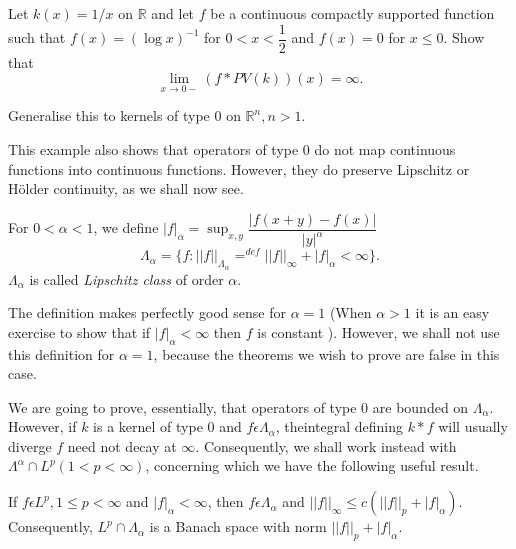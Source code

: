 \begin{exercise} 
  Let $k (x) = 1/x$ on $\mathbb{R}$ and let $f$ be a
  continuous compactly supported function such that $f(x) = (\log
  x)^{-1}$ for $0 < x < \dfrac{1}{2}$ and $f(x) =0$ for $x \leq 0$. Show that  
  $$
  \lim_{x \to 0-} (f * PV (k) ) (x) = \infty.
  $$
\end{exercise}

Generalise this to kernels of type $0$ on $\mathbb{R}^n, n > 1$.

This example also shows that operators of type $0$ do not map
continuous functions into continuous functions. However, they do
preserve Lipschitz or H\"{o}lder continuity, as we shall now see. 

\setcounter{defi}{20}
\begin{defi}\label{chap5:def5.21}%
  For $0< \alpha < 1$, we define $|f|_\alpha = \sup_{x,y} \dfrac{|f
    (x+y) - f (x)|}{|y|^\alpha}$ 
  $$
  \Lambda_{\alpha} = \{ f: || f ||_{\Lambda_{\alpha}} =^{def} || f ||
  _{\infty} + | f | _{\alpha} < \infty \}. 
  $$
  $\Lambda_{\alpha}$ is called {\em Lipschitz class} of order $\alpha$.
\end{defi}

\setcounter{rem}{21}
\begin{rem}\label{chap5:rem5.22} %
  The definition makes perfectly good sense for $\alpha =1$ (When
  $\alpha > 1$ it is an easy exercise to show that if $|f|_{\alpha}<
  \infty$ then $f$ is constant ). However, we shall not use this
  definition for $ \alpha = 1$, because the theorems we wish to prove
  are false in this case. 
\end{rem}

We are going to prove, essentially, that operators of type $0$ are
boun\-ded on $\Lambda_{\alpha}$. However, if $k$ is a kernel of type
$0$ and $f \epsilon \Lambda_{\alpha}$, the\pageoriginale integral defining $k* f$
will usually diverge $f$ need not decay at $\infty$. Consequently, we
shall work instead with $\Lambda^{\alpha } \cap  L^p (1 < p <
\infty)$, concerning which we have the following useful result. 

\setcounter{prop}{22}
\begin{prop}\label{chap5:prop5.23}%
  If $f \epsilon L^p, 1 \leq p < \infty $ and $|f|_{\alpha}<
    \infty$, then $f \epsilon \Lambda_{\alpha} $ and $|| f ||
    _{\infty} \leq c (|| f || _p + |f|_{\alpha})$. Consequently,  $L^p
    \cap \Lambda_{\alpha}$ is a Banach space with norm $|| f || _p + |f|
    _{\alpha}$. 
\end{prop}

